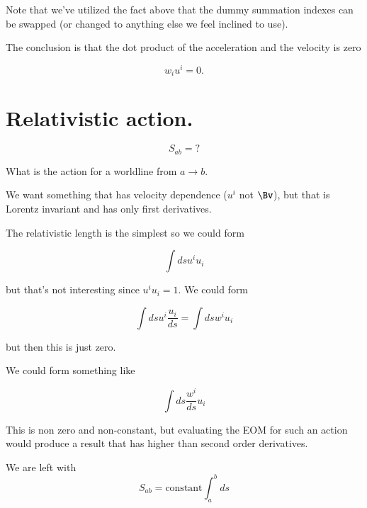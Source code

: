 Note that we've utilized the fact above that the dummy summation indexes can be swapped (or changed to anything else we feel inclined to use).

The conclusion is that the dot product of the acceleration and the velocity is zero

\begin{equation}\label{eqn:relativisticElectrodynamicsL7:130}
w_i u^i = 0.
\end{equation}

\section{Relativistic action.}

\begin{equation}\label{eqn:relativisticElectrodynamicsL7:140}
S_{ab} = ?
\end{equation}

What is the action for a worldline from $a \rightarrow b$.

We want something that has velocity dependence ($u^i$ not $\Bv$), but that is Lorentz invariant and has only first derivatives.

The relativistic length is the simplest so we could form

\begin{equation}\label{eqn:relativisticElectrodynamicsL7:150}
\int ds u^i u_i
\end{equation}

but that's not interesting since $u^i u_i = 1$.  We could form

\begin{equation}\label{eqn:relativisticElectrodynamicsL7:160}
\int ds u^i \frac{u_i}{ds} = \int ds w^i u_i
\end{equation}

but then this is just zero.

We could form something like

\begin{equation}\label{eqn:relativisticElectrodynamicsL7:170}
\int ds \frac{w^i}{ds} u_i
\end{equation}

This is non zero and non-constant, but evaluating the EOM for such an action would produce a result that has higher than second order derivatives.

We are left with
\begin{equation}\label{eqn:relativisticElectrodynamicsL7:180}
S_{ab} = \text{constant} \int_a^b ds 
\end{equation}


